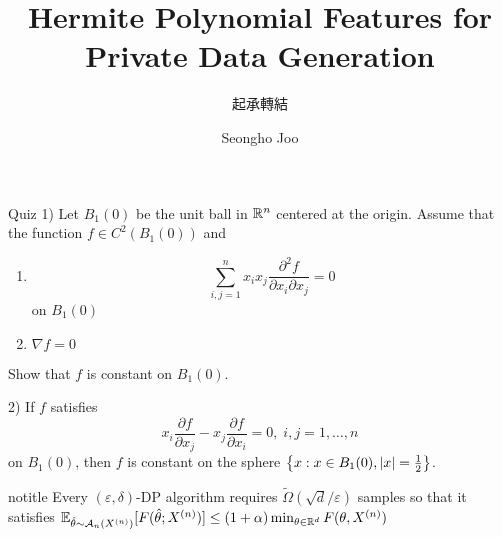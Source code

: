 \documentclass[9pt,t,aspectratio=169]{beamer}
\title{Hermite Polynomial Features for Private Data Generation}
\subtitle{起承轉結}
\date{}
\author{Seongho Joo}
\institute{SNU MILAB}
\begin{document}
\maketitle
\begin{frame}{}
\begin{exampleblock}{Quiz}
    1) Let $B_1(0)$ be the unit ball in $\mathbb{R}^n$ centered at the origin. Assume that the function $f \in C^2(B_1(0))$ and 
    \begin{enumerate}
        \item\begin{equation}
            \sum_{i, j=1}^n x_i x_j \frac{\partial^2 f}{\partial x_i \partial x_j} =0 
        \end{equation}
        on $B_1(0)$
        \item $\nabla f = 0$
    \end{enumerate}
    Show that $f$ is constant on $B_1(0)$.
    
    2) If $f$ satisfies 
    \begin{equation}
        x_i \frac{\partial f}{\partial x_j} - x_j \frac{\partial f}{\partial x_i} =0, \; i,j = 1, \dots, n 
    \end{equation}
    on $B_1(0)$, then $f$ is constant on the sphere $\left\{ x: x \in B_1(0), |x| = \frac{1}{2} \right\}$.
\end{exampleblock}
\end{frame}
\begin{frame}{notitle}
Every $(\varepsilon, \delta)$-DP algorithm requires $\tilde{\Omega}(\sqrt{d} /\varepsilon)$ samples so that it satisfies $\mathop{\mathbb{E} \displaystyle}_{\hat{\theta} \sim \mathcal{A}_n (X^{(n)})} [ F ( \hat{\theta}; X^{(n)})] \leq (1+\alpha) \min_{\theta \in \mathbb{R}^d} F (\theta, X^{(n)})$
\end{frame}
\end{document}
